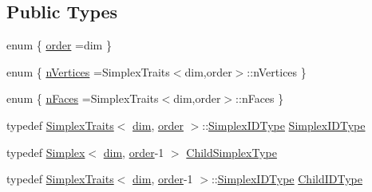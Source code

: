 \subsection*{Public Types}
\begin{DoxyCompactItemize}
\item 
enum \{ \hyperlink{classmodel_1_1_simplex_3_01dim_00_01dim_01_4_a672eb92ce92b8eba0dfbef5e759d3872abba4b0c668ec5635b83f2131e9d1bbbb}{order} =dim
 \}
\item 
enum \{ \hyperlink{classmodel_1_1_simplex_3_01dim_00_01dim_01_4_ac075172a9e7d0ecaafb3cf4dff467e18ac3e906d1cd7d7182daeb0db8102287b7}{n\+Vertices} =Simplex\+Traits$<$dim,order$>$\+:\+:n\+Vertices
 \}
\item 
enum \{ \hyperlink{classmodel_1_1_simplex_3_01dim_00_01dim_01_4_a7a6632ff31493d2d8ade44f51f3128cda886854b5f289a9619e5e3c0bd936178f}{n\+Faces} =Simplex\+Traits$<$dim,order$>$\+:\+:n\+Faces
 \}
\item 
typedef \hyperlink{structmodel_1_1_simplex_traits}{Simplex\+Traits}$<$ \hyperlink{plot_nd_a_8m_a382f3ca768b275b8d563604f7fc7df73}{dim}, \hyperlink{classmodel_1_1_simplex_3_01dim_00_01dim_01_4_a672eb92ce92b8eba0dfbef5e759d3872abba4b0c668ec5635b83f2131e9d1bbbb}{order} $>$\+::\hyperlink{classmodel_1_1_simplex_3_01dim_00_01dim_01_4_a8d7186530898fce37d1bce8480342a36}{Simplex\+I\+D\+Type} \hyperlink{classmodel_1_1_simplex_3_01dim_00_01dim_01_4_a8d7186530898fce37d1bce8480342a36}{Simplex\+I\+D\+Type}
\item 
typedef \hyperlink{classmodel_1_1_simplex}{Simplex}$<$ \hyperlink{plot_nd_a_8m_a382f3ca768b275b8d563604f7fc7df73}{dim}, \hyperlink{classmodel_1_1_simplex_3_01dim_00_01dim_01_4_a672eb92ce92b8eba0dfbef5e759d3872abba4b0c668ec5635b83f2131e9d1bbbb}{order}-\/1 $>$ \hyperlink{classmodel_1_1_simplex_3_01dim_00_01dim_01_4_a98484d69325ced6e24564af07c180261}{Child\+Simplex\+Type}
\item 
typedef \hyperlink{structmodel_1_1_simplex_traits}{Simplex\+Traits}$<$ \hyperlink{plot_nd_a_8m_a382f3ca768b275b8d563604f7fc7df73}{dim}, \hyperlink{classmodel_1_1_simplex_3_01dim_00_01dim_01_4_a672eb92ce92b8eba0dfbef5e759d3872abba4b0c668ec5635b83f2131e9d1bbbb}{order}-\/1 $>$\+::\hyperlink{classmodel_1_1_simplex_3_01dim_00_01dim_01_4_a8d7186530898fce37d1bce8480342a36}{Simplex\+I\+D\+Type} \hyperlink{classmodel_1_1_simplex_3_01dim_00_01dim_01_4_ab1ada569e89e2332e245a1ab0cb8a4f9}{Child\+I\+D\+Type}
\end{DoxyCompactItemize}

